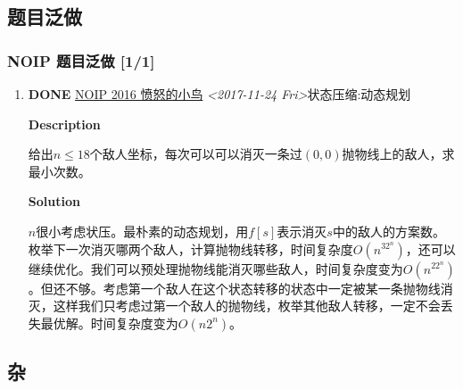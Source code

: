 \documentclass[11pt]{article}
\begin{document}
\subsection{题目泛做}
\label{sec-2-1}
\subsubsection{NOIP 题目泛做 [1/1]}
\label{sec-2-1-1}
\begin{enumerate}
\item {\bfseries\sffamily DONE} \href{https://www.luogu.org/problemnew/show/2831}{NOIP 2016 愤怒的小鸟} \textit{<2017-11-24 Fri>}\hfill{}\textsc{状态压缩:动态规划}
\label{sec-2-1-1-1}

\textbf{Description}

给出\(n \leq 18\)个敌人坐标，每次可以可以消灭一条过\((0,0)\)抛物线上的敌人，求最小次数。

\textbf{Solution}

\(n\)很小考虑状压。最朴素的动态规划，用\(f[s]\)表示消灭\(s\)中的敌人的方案数。枚举下一次消灭哪两个敌人，计算抛物线转移，时间复杂度\(O(n^32^n)\)，还可以继续优化。我们可以预处理抛物线能消灭哪些敌人，时间复杂度变为\(O(n^22^n)\)。但还不够。考虑第一个敌人在这个状态转移的状态中一定被某一条抛物线消灭，这样我们只考虑过第一个敌人的抛物线，枚举其他敌人转移，一定不会丢失最优解。时间复杂度变为\(O(n2^n)\)。
\end{enumerate}

\subsection{杂}
\label{sec-2-2}
\end{document}

